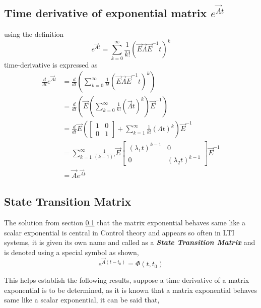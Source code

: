 \subsection{Time derivative of exponential matrix $e^{\vec{A} t}$} \label{Sec_1_ch_1_ddtOfMatrixExp}

using the definition
\begin{equation}
e^{\vec{A}t} = \sum_{k = 0}^{\infty} \frac{1}{k!}(\vec{E}\vec{\Lambda}\vec{E}^{-1} t)^{k}
\end{equation}
time-derivative is expressed as
\begin{align*}
	\frac{d}{dt} e^{\vec{A}t} &= \frac{d}{dt} \left(\sum_{k = 0}^{\infty} \frac{1}{k!}(\vec{E}\vec{\Lambda}\vec{E}^{-1} t)^{k}\right) \\
							&= \frac{d}{dt} \left(\vec{E} \left(\sum_{k = 0}^{\infty} \frac{1}{k!} (\vec{\Lambda} t)^{k} \right) \vec{E}^{-1}\right) \\
							&= \frac{d}{dt} \vec{E} \left(\begin{bmatrix}
								1 & 0 \\ 0 & 1
							\end{bmatrix} + \sum_{k=1}^{\infty} \frac{1}{k!}(\Lambda t)^{k} \right) \vec{E}^{-1} \\
							&= \sum_{k=1}^{\infty} \frac{1}{(k - 1)!} \vec{E} \begin{bmatrix}
								(\lambda_{1} t)^{k-1} & 0 \\ 0 & (\lambda_{2} t)^{k-1}
							\end{bmatrix} \vec{E}^{-1} \\
							&= \vec{A}e^{\vec{A}t}
\end{align*}

\subsection{State Transition Matrix}
The solution from section \ref{Sec_1_ch_1_ddtOfMatrixExp} that the matrix exponential behaves same like a scalar exponential is central in Control theory and appears so often in LTI systems, it is given its own name and called as a \textbf{\textit{State Transition Matrix}} and is denoted using a special symbol as shown,
\begin{equation}
	e^{\vec{A}(t - t_{0})} = \Phi(t, t_{0})
\end{equation}

This helps establish the following results, suppose a time derivative of a matrix exponential is to be determined, as it is known that a  matrix exponential behaves same like a scalar exponential, it can be said that,

